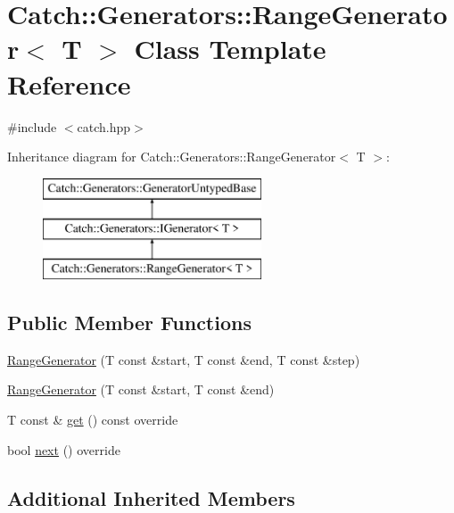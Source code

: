 \hypertarget{class_catch_1_1_generators_1_1_range_generator}{}\section{Catch\+:\+:Generators\+:\+:Range\+Generator$<$ T $>$ Class Template Reference}
\label{class_catch_1_1_generators_1_1_range_generator}


{\ttfamily \#include $<$catch.\+hpp$>$}

Inheritance diagram for Catch\+:\+:Generators\+:\+:Range\+Generator$<$ T $>$\+:\begin{figure}[H]
\begin{center}
\leavevmode
\includegraphics[height=3.000000cm]{class_catch_1_1_generators_1_1_range_generator}
\end{center}
\end{figure}
\subsection*{Public Member Functions}
\begin{DoxyCompactItemize}
\item 
\mbox{\hyperlink{class_catch_1_1_generators_1_1_range_generator_a6a9b3cc009471c085c985642e0ab102e}{Range\+Generator}} (T const \&start, T const \&end, T const \&step)
\item 
\mbox{\hyperlink{class_catch_1_1_generators_1_1_range_generator_ac999eb143945ff311b97d2c767df90d3}{Range\+Generator}} (T const \&start, T const \&end)
\item 
T const  \& \mbox{\hyperlink{class_catch_1_1_generators_1_1_range_generator_a2639173bb9f06ba353314cd226fcefec}{get}} () const override
\item 
bool \mbox{\hyperlink{class_catch_1_1_generators_1_1_range_generator_a4e6b2038832f09724d5a4355b4691259}{next}} () override
\end{DoxyCompactItemize}
\subsection*{Additional Inherited Members}


